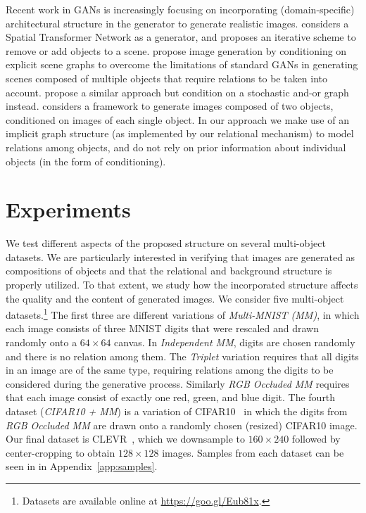 \documentclass{article}
\begin{document}
Recent work in GANs is increasingly focusing on incorporating (domain-specific) architectural structure in the generator to generate realistic images.
\cite{lin2018st} considers a Spatial Transformer Network as a generator, and proposes an iterative scheme to remove or add objects to a scene.
\cite{johnson2018image} propose image generation by conditioning on explicit scene graphs to overcome the limitations of standard GANs in generating scenes composed of multiple objects that require relations to be taken into account.
\cite{xu2018deep} propose a similar approach but condition on a stochastic and-or graph instead.
\cite{azadi2018compositional} considers a framework to generate images composed of two objects, conditioned on images of each single object.
In our approach we make use of an implicit graph structure (as implemented by our relational mechanism) to model relations among objects, and do not rely on prior information about individual objects (in the form of conditioning).


\section{Experiments}
We test different aspects of the proposed structure on several multi-object datasets.
We are particularly interested in verifying that images are generated as compositions of objects and that the relational and background structure is properly utilized.
To that extent, we study how the incorporated structure affects the quality and the content of generated images.
We consider five multi-object datasets.\footnote{Datasets are available online at \url{https://goo.gl/Eub81x}.}
The first three are different variations of \emph{Multi-MNIST (MM)}, in which each image consists of three MNIST digits that were rescaled and drawn randomly onto a $64 \times 64$ canvas.
In \emph{Independent MM}, digits are chosen randomly and there is no relation among them.
The \emph{Triplet} variation requires that all digits in an image are of the same type, requiring relations among the digits to be considered during the generative process.
Similarly \emph{RGB Occluded MM} requires that each image consist of exactly one red, green, and blue digit.
The fourth dataset (\emph{CIFAR10 + MM}) is a variation of CIFAR10~\citep{krizhevsky2009learning} in which the digits from \emph{RGB Occluded MM} are drawn onto a randomly chosen (resized) CIFAR10 image.
Our final dataset is CLEVR~\citep{johnson2017clevr}, which we downsample to $160 \times 240$ followed by center-cropping to obtain $128 \times 128$ images.
Samples from each dataset can be seen in in Appendix~\ref{app:samples}.
\end{document}
